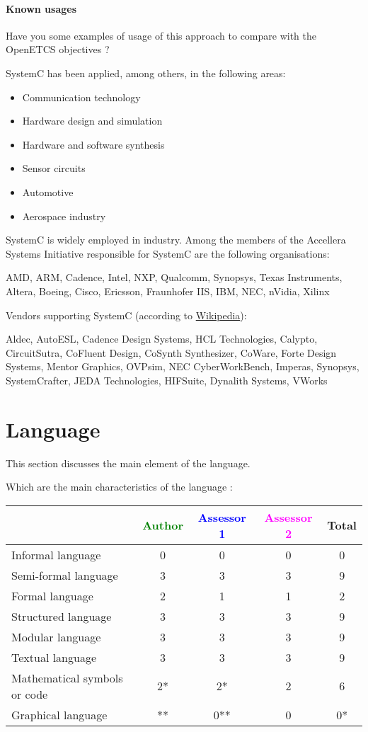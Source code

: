 \paragraph{Known usages} Have you some examples of usage of this approach to compare with the OpenETCS objectives ?

SystemC has been applied, among others, in the following areas:

\begin{itemize}
\item Communication technology
\item Hardware design and simulation
\item Hardware and software synthesis
\item Sensor circuits
\item Automotive
\item Aerospace industry
\end{itemize}

SystemC is widely employed in industry. Among the members of the Accellera Systems Initiative responsible for SystemC are the following organisations:

AMD, ARM, Cadence, Intel, NXP, Qualcomm, Synopsys, Texas Instruments, Altera, Boeing, Cisco, Ericsson, Fraunhofer IIS, IBM, NEC, nVidia, Xilinx

Vendors supporting SystemC (according to \href{http://en.wikipedia.org/wiki/SystemC}{Wikipedia}):

Aldec, AutoESL, Cadence Design Systems, HCL Technologies, Calypto, CircuitSutra, CoFluent Design, CoSynth Synthesizer, CoWare, Forte Design Systems, Mentor Graphics, OVPsim, NEC CyberWorkBench, Imperas, Synopsys, SystemCrafter, JEDA Technologies, HIFSuite, Dynalith Systems, VWorks


\section{Language}
This section discusses the main element of the language.

Which are the main characteristics of the language :

\begin{tabular}{|l | c | c | c | c|}
\hline
& \textcolor{green}{Author} & \textcolor{blue}{Assessor 1} & \textcolor{magenta}{Assessor 2} & Total \\
\hline
Informal language &0 & 0 & 0 & 0 \\
\hline
Semi-formal language &3 & 3& 3 & 9 \\
\hline
Formal language &2 &1 & 1 & 2 \\
\hline
Structured language &3 &3 & 3 & 9 \\
\hline
Modular language &3 &3 & 3 & 9  \\
\hline
Textual language &3 &3 & 3 & 9 \\
\hline
Mathematical symbols or code &2* &2* & 2 & 6 \\
\hline
Graphical language &** & 0**& 0 &  0* \\
\hline
\end{tabular}

